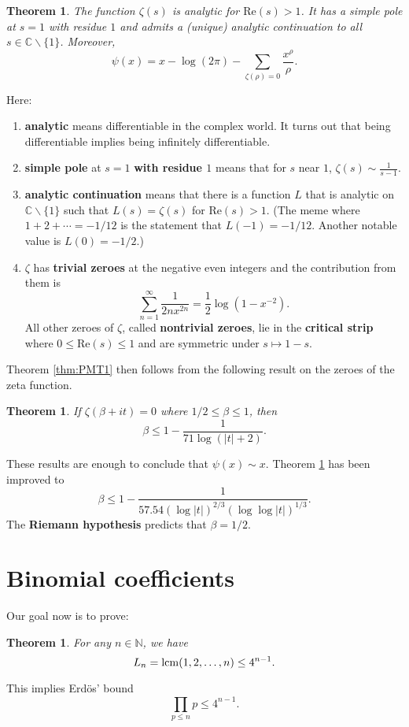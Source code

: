\documentclass{article}
\def\lcm{{\rm lcm}}
\def\N{{\mathbb N}}
\def\C{{\mathbb C}}
\newtheorem{theorem}[subsection]{Theorem}
\begin{document}
\begin{theorem}\label{thm:psis}
    The function $\zeta(s)$ is analytic for $\text{Re}(s)>1$. It has a simple pole at $s = 1$ with residue $1$ and admits a (unique) analytic continuation to all $s\in\C\backslash\{1\}$. Moreover, 
    $$\psi(x) = x - \log(2\pi) - \sum_{\zeta(\rho) = 0}\frac{x^\rho}{\rho}.$$
\end{theorem}
Here:
\begin{enumerate}
    \item \textbf{analytic} means differentiable in the complex world. It turns out that being differentiable implies being infinitely differentiable.
    \item \textbf{simple pole} at $s=1$ \textbf{with residue $1$} means that for $s$ near $1$, $\zeta(s)\sim\frac{1}{s-1}.$
    \item \textbf{analytic continuation} means that there is a function $L$ that is analytic on $\C\backslash\{1\}$ such that $L(s) = \zeta(s)$ for $\text{Re}(s)>1$. (The meme where $1+2+\cdots = -1/12$ is the statement that $L(-1) = -1/12$. Another notable value is $L(0) = -1/2$.)
    \item $\zeta$ has \textbf{trivial zeroes} at the negative even integers and the contribution from them is $$\sum_{n=1}^\infty \frac{1}{2nx^{2n}} = \frac12\log(1 - x^{-2}).$$
    All other zeroes of $\zeta$, called \textbf{nontrivial zeroes}, lie in the \textbf{critical strip} where $0 \leq \text{Re}(s) \leq 1$ and are symmetric under $s\mapsto 1-s$.
\end{enumerate}

Theorem \ref{thm:PMT1} then follows from the following result on the zeroes of the zeta function.

\begin{theorem}\label{thm:zerofree}
    If $\zeta(\beta+ it) = 0$ where $1/2\leq\beta\leq 1$, then $$\beta \leq 1 - \frac{1}{71\log(|t|+2)}.$$
\end{theorem}

These results are enough to conclude that $\psi(x)\sim x$. Theorem \ref{thm:zerofree} has been improved to
$$\beta \leq 1 - \frac{1}{57.54(\log |t|)^{2/3}(\log\log|t|)^{1/3}}.$$
The \textbf{Riemann hypothesis} predicts that $\beta = 1/2$.

\section{Binomial coefficients}

Our goal now is to prove:
\begin{theorem}\label{thm:Ln}
    For any $n\in\N$, we have $$L_n = \lcm(1,2,\ldots,n) \leq 4^{n-1}.$$
\end{theorem}
This implies Erd\"{o}s' bound
$$\prod_{p\leq n}p \leq 4^{n-1}.$$
\end{document}
